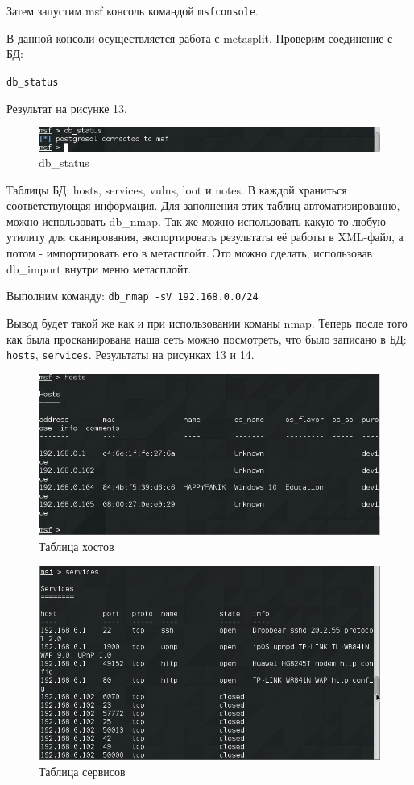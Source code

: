 \documentclass[11pt, a4paper]{article}		%
\begin{document}
Затем запустим msf консоль командой \verb'msfconsole'.

В данной консоли осуществляется работа с metasplit. Проверим соединение с БД:

\verb'db_status'

Результат на рисунке 13.

\begin{figure}[h!]
\centering
\includegraphics[scale=0.8]{res/8}
\caption{db\_status}
\end{figure}

Таблицы БД: hosts, services, vulns, loot и notes. В каждой храниться соответствующая информация.
Для заполнения этих таблиц автоматизированно, можно использовать db\_nmap. Так же можно использовать какую-то любую утилиту для сканирования, экспортировать результаты её работы в XML-файл, а потом - импортировать его в метасплойт. Это можно сделать, использовав db\_import внутри меню метасплойт.

Выполним команду: \verb'db_nmap -sV 192.168.0.0/24'

Вывод будет такой же как и при использовании команы nmap. Теперь после того как была просканирована наша сеть можно посмотреть, что было записано в БД: \verb'hosts', \verb'services'. Результаты на рисунках 13 и 14.

\begin{figure}[h!]
\centering
\includegraphics[scale=0.8]{res/9}
\caption{Таблица хостов}
\end{figure}

\begin{figure}[h!]
\centering
\includegraphics[scale=0.8]{res/10}
\caption{Таблица сервисов}
\end{figure}
\end{document}
